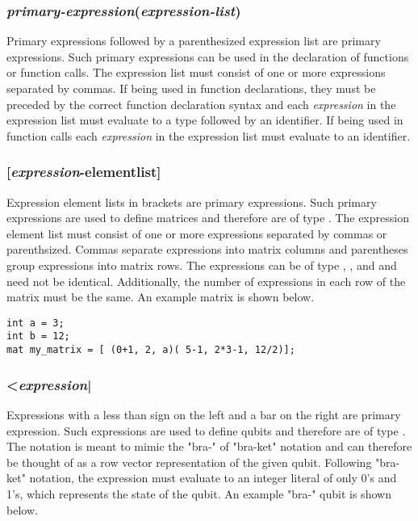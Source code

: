 \subsubsection{\textit{primary-expression}(\textit{expression-list})}
Primary expressions followed by a parenthesized expression list are primary expressions. Such primary expressions can be used in the declaration of functions or function calls. The expression list must consist of one or more expressions separated by commas. If being used in function declarations, they must be preceded by the correct function declaration syntax and each \textit{expression} in the expression list must evaluate to a type followed by an identifier. If being used in function calls each \textit{expression} in the expression list must evaluate to an identifier.

\subsubsection{[\textit{expression}-elementlist]}
Expression element lists in brackets are primary expressions. Such primary expressions are used to define matrices and therefore are of type \mat. The expression element list must consist of one or more expressions separated by commas or parenthsized. Commas separate expressions into matrix columns and parentheses group expressions into matrix rows. The expressions can be of type \integ, \float, and \complex and need not be identical. Additionally, the number of expressions in each row of the matrix must be the same. An example matrix is shown below.

\begin{lstlisting}
int a = 3;
int b = 12;
mat my_matrix = [ (0+1, 2, a)( 5-1, 2*3-1, 12/2)];
\end{lstlisting}

\subsubsection{<\textit{expression}|}
Expressions with a less than sign on the left and a bar on the right are primary expression. Such expressions are used to define qubits and therefore are of type \mat. The notation is meant to mimic the "bra-" of "bra-ket" notation and can therefore be thought of as a row vector representation of the given qubit. Following "bra-ket" notation, the expression must evaluate  to an integer literal of only 0's and 1's, which represents the state of the qubit. An example "bra-" qubit is shown below.

